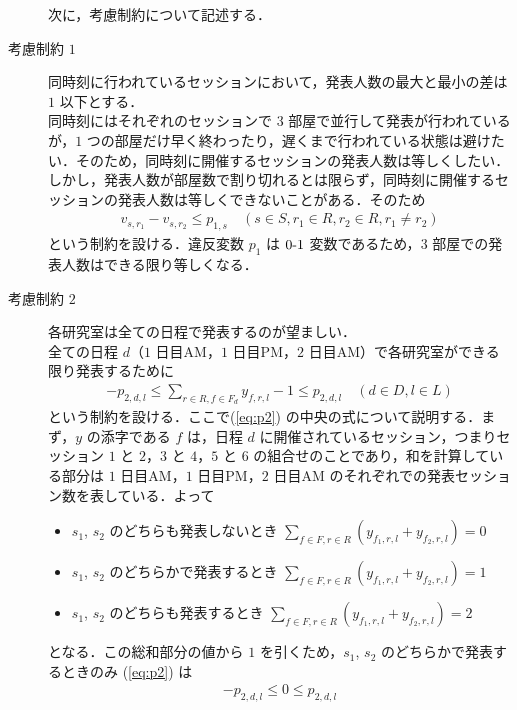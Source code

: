 \documentclass[a4paper,12pt,fleqn]{jarticle}
\begin{document}
\begin{description}
 次に，考慮制約について記述する．\\
\item[考慮制約 $1$] 同時刻に行われているセッションにおいて，発表人数の最大と最小の差は $1$ 以下とする．\\同時刻にはそれぞれのセッションで $3$ 部屋で並行して発表が行われているが，$1$ つの部屋だけ早く終わったり，遅くまで行われている状態は避けたい．そのため，同時刻に開催するセッションの発表人数は等しくしたい．しかし，発表人数が部屋数で割り切れるとは限らず，同時刻に開催するセッションの発表人数は等しくできないことがある．そのため
  \begin{eqnarray}
    v_{s,r_1} - v_{s,r_2} \leq p_{1,s} \quad (s \in S, r_1 \in R, r_2 \in R,  r_1 \neq r_2)
  \end{eqnarray}
  という制約を設ける．違反変数 $p_1$ は $0\mathchar`-1$ 変数であるため，$3$ 部屋での発表人数はできる限り等しくなる．
\item[考慮制約 $2$] 各研究室は全ての日程で発表するのが望ましい．\\全ての日程 $d$（$1$ 日目AM，$1$ 日目PM，$2$ 日目AM）で各研究室ができる限り発表するために
  \begin{eqnarray}
    -p_{2,d,l} \leq \sum_{r \in R, f \in F_d} y_{f,r,l} - 1 \leq p_{2,d,l} \quad (d \in D, l \in L) \label{eq:p2}
  \end{eqnarray}
  という制約を設ける．ここで(\ref{eq:p2}) の中央の式について説明する．まず，$y$ の添字である $f$ は，日程 $d$ に開催されているセッション，つまりセッション $1$ と $2$，$3$ と $4$，$5$ と $6$ の組合せのことであり，和を計算している部分は $1$ 日目AM，$1$ 日目PM，$2$ 日目AM のそれぞれでの発表セッション数を表している．よって
  \begin{itemize}
  \item $s_1$, $s_2$ のどちらも発表しないとき \quad $\displaystyle \sum_{f \in F,r \in R} (y_{f_1,r,l} + y_{f_2,r,l}) = 0$
  \item $s_1$, $s_2$ のどちらかで発表するとき \quad $\displaystyle \sum_{f \in F,r \in R} (y_{f_1,r,l} + y_{f_2,r,l}) = 1$
  \item $s_1$, $s_2$ のどちらも発表するとき \qquad $\displaystyle \sum_{f \in F,r \in R} (y_{f_1,r,l} + y_{f_2,r,l}) = 2$
  \end{itemize}
  となる．この総和部分の値から $1$ を引くため，$s_1$, $s_2$ のどちらかで発表するときのみ (\ref{eq:p2}) は 
  \begin{eqnarray*}
    -p_{2,d,l} \leq 0 \leq p_{2,d,l}
  \end{eqnarray*}

\end{description}
\end{document}
